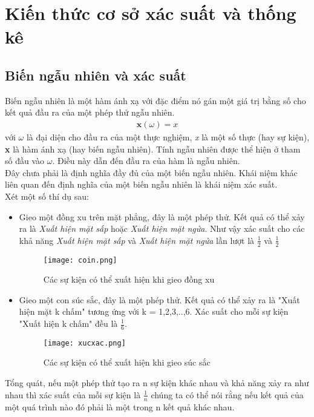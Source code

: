 \chapter{Kiến thức cơ sở xác suất và thống kê}\label{ch:1}
\section{Biến ngẫu nhiên và xác suất}\label{sec:1.1}
Biến ngẫu nhiên là một hàm ánh xạ với đặc điểm nó gán một giá trị bằng số cho kết quả đầu ra của một phép thử ngẫu nhiên.\cite{thongke}
\begin{align}
    \textbf{x}(\omega)=\textit{x}
\end{align}
với $\omega$ là đại diện cho đầu ra của một thực nghiệm, \textit{x} là một số thực (hay sự kiện), \textbf{x} là hàm ánh xạ (hay biến ngẫu nhiên).  
Tính ngẫu nhiên được thể hiện ở tham số đầu vào $\omega$. Điều này dẫn đến đầu ra của hàm là ngẫu nhiên.\\
Đây chưa phải là định nghĩa đầy đủ của một biến ngẫu nhiên. Khái niệm khác liên quan đến định nghĩa của một biến ngẫu nhiên là khái niệm xác suất. \\
Xét một số thí dụ sau:
\begin{itemize}
    \item Gieo một đồng xu trên mặt phẳng, đây là một phép thử. Kết quả có thể xảy ra là \textit{Xuất hiện mặt sấp} hoặc \textit{Xuất hiện mặt ngửa}. Như vậy xác suất cho các khả năng \textit{Xuất hiện mặt sấp} và \textit{Xuất hiện mặt ngửa} lần lượt là 
	$ \frac{1}{2} $ và $ \frac{1}{2} $
	\begin{figure}[H]
		\centering
		\texttt{[image: coin.png]}
		\caption{Các sự kiện có thể xuất hiện khi gieo đồng xu}
	   \end{figure}
    \item Gieo một con súc sắc, đây là một phép thử. Kết quả có thể xảy ra là "Xuất hiện mặt k chấm" tương ứng với k = 1,2,3,..,6. Xác suất cho mỗi sự kiện "Xuất hiện k chấm" đều là $ \frac{1}{6} $.
    \begin{figure}[H]
		\centering
		\texttt{[image: xucxac.png]}
		\caption{Các sự kiện có thể xuất hiện khi gieo súc sắc}
	   \end{figure}
\end{itemize}
Tổng quát, nếu một phép thử tạo ra n sự kiện khác nhau và khả năng xảy ra như nhau thì xác suất của mỗi sự kiện là $ \frac{1}{n} $
chúng ta có thể nói rằng nếu kết quả của một quá trình nào đó phải là một trong n kết quả khác nhau. 
\par

